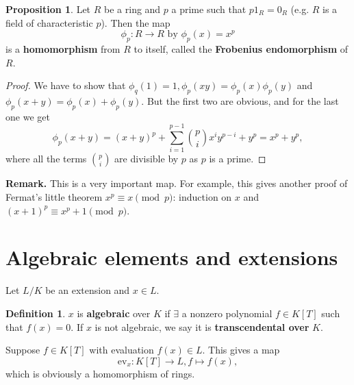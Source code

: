 \documentclass{article}
\theoremstyle{definition}
\newtheorem{prop}[theorem]{Proposition}
\newtheorem{defn}{Definition}[section]
\begin{document}

\begin{prop}
    Let $R$ be a ring and $p$ a prime such that $p 1_{R} = 0_R$ (e.g. $R$ is a field of characteristic $p$). Then the map $$\phi_p: R \to R \text{ by }  \phi_p(x) = x^p$$ is a \textbf{homomorphism} from $R$ to itself, called the \textbf{Frobenius endomorphism} of $R$.
\end{prop}
\begin{proof}
    We have to show that $\phi_q(1)=1, \phi_p(xy)= \phi_p(x)\phi_p(y)$ and $\phi_p(x+y)= \phi_p(x) + \phi_p(y)$. But the first two are obvious, and for the last one we get \[
    \phi_p(x+y) = (x+y)^{p} + \sum_{i=1}^{p-1} {{p} \choose {i}} x^i y^{p-i} + y^p = x^p + y^p
    ,\]
    where all the terms ${{p}\choose{i}}$ are divisible by $p$ as $p$ is a prime.
\end{proof}
\textbf{Remark.} This is a very important map. For example, this gives another proof of Fermat's little theorem $x^p \equiv x \pmod{p}$: induction on $x$ and $(x+1)^p \equiv x^p + 1 \pmod{p}$.

\section{Algebraic elements and extensions}
Let $L/K$ be an extension and $x \in L$.
\begin{defn}
    $x$ is \textbf{algebraic} over $K$ if $\exists$ a nonzero polynomial $f \in K[T]$ such that $f(x)=0$. If $x$ is not algebraic, we say it is \textbf{transcendental over} $K$.
\end{defn}
Suppose $f \in K[T]$ with evaluation $f(x) \in L$. This gives a map $$\text{ev}_x : K[T] \to L, f \mapsto f(x),$$ which is obviously a homomorphism of rings.
\vspace{1mm}
\end{document}
